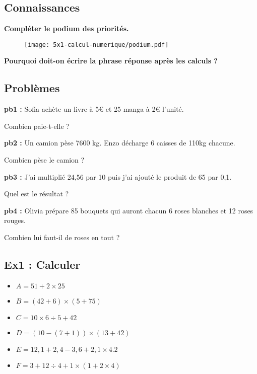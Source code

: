 \subsection*{Connaissances} 

\textbf{Compléter le podium des priorités.} 
\begin{figure}[H]
  \centering
  \texttt{[image: 5x1-calcul-numerique/podium.pdf]}
\end{figure} 

\textbf{Pourquoi doit-on écrire la phrase réponse après les calculs ?} \\ \Pointilles[2]


\subsection*{Problèmes}

\textbf{pb1 : }
Sofia achète un livre à 5€ et 25 manga à 2€ l'unité. 

Combien paie-t-elle ?  \\ \Pointilles[5]

\textbf{pb2 : }
Un camion pèse 7600 kg. Enzo décharge 6 caisses de 110kg chacune. 

Combien pèse le camion ? \\ \Pointilles[5] 

\textbf{pb3 : }
\og J'ai multiplié 24,56 par 10 puis j'ai ajouté le produit de 65 par 0,1.\fg 

Quel est le résultat ? \\ \Pointilles[5]

\textbf{pb4 : }
Olivia prépare 85 bouquets qui auront chacun 6 roses blanches et 12 roses rouges.

Combien lui faut-il de roses en tout ? \\ \Pointilles[5]

\newpage

\subsection*{Ex1 : Calculer}

\begin{multicols}{3}\begin{itemize}[label={$\bullet$}]
  \item $A = 51 + 2 \times 25$ 
  \item $B = (42 + 6) \times (5+75)$
  \item $C = 10 \times 6 \div 5 + 42$
  \item $D = (10 - (7 + 1)) \times (13 + 42)$
  \item $E = 12,1 + 2,4 - 3,6 + 2,1 \times 4.2$
  \item $F = 3 + 12 \div 4 + 1 \times (1 + 2 \times 4)$
\end{itemize}\end{multicols}

\Pointilles[48]


